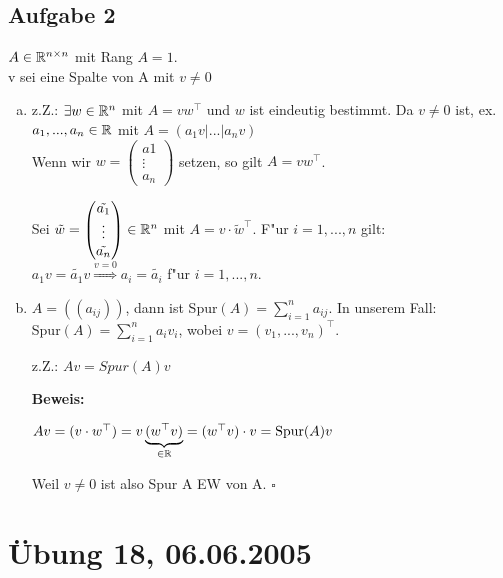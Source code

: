 \documentclass[a4paper,twoside,DIV15,BCOR12mm]{scrbook}
\newcommand{\enua}{\ \begin{enumerate}[a)]}
\newcommand{\une}{\end{enumerate}}
\newcommand{\RA}{\Rightarrow}
\newcommand{\x}{\cdot}
\newcommand{\trans}{^\top}
\providecommand{\matr}[1]{\begin{pmatrix}#1\end{pmatrix}}
\newenvironment{bew}{\pagebreak[2]\textbf{Beweis: }}{\qed}
\renewcommand{\qed}{\hspace*{\fill} \ensuremath{\square}}
\begin{document}
\subsection {Aufgabe 2}
$A\in\mathbb{R}^{n\times n}$ mit Rang $A=1$.\\
v sei eine Spalte von A mit $v\neq0$
\enua
\item z.Z.: $\exists w\in\mathbb{R}^n$ mit $A=vw\trans$ und $w$ ist eindeutig bestimmt.
Da $v\neq 0$ ist, ex. $a_1,...,a_n\in\mathbb{R}$ mit $A=(a_1v|...|a_nv)$\\
Wenn wir $w=\matr{a1\\\vdots\\a_n}$ setzen, so gilt $A=vw\trans$.\par
Sei $\tilde w=\matr{\tilde{a_1}\\\vdots\\\tilde{a_n}}\in\MdR^n$ mit $A=v\x\tilde w\trans$. F"ur $i=1,...,n$ gilt:
$a_1v=\tilde {a_1}v\overset{v=0}{\RA}a_i=\tilde{a_i}$ f"ur $i=1,...,n$.
\item
$A=((a_{ij}))$, dann ist Spur$(A)=\sum\limits_{i=1}^n{a_{ij}}$. In unserem Fall:\\
Spur$(A)=\sum\limits_{i=1}^n{a_iv_i}$, wobei $v=(v_1,...,v_n)\trans$.\par
z.Z.: $Av=Spur(A)v$\par
\begin{bew}\par
$Av=(v\x w\trans)=v\underbrace{(w\trans v)}_{\in\MdR}=(w\trans v)\x v=\text{Spur}(A)v$\par
Weil $v\neq 0$ ist also Spur A EW von A.
\end{bew}
\une
\section {Übung 18, 06.06.2005}
\end{document}
